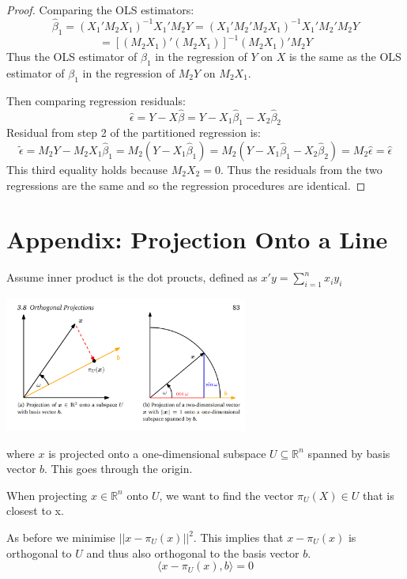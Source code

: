 \documentclass[DIV=14,titlepage=false]{scrreprt}
\begin{document}
\begin{proof}
Comparing the OLS estimators:
\[\hat{\beta}_1=(X_1'M_2X_1)^{-1}X_1'M_2Y=(X_1'M_2'M_2X_1)^{-1}X_1'M_2'M_2Y\]
\[=[(M_2X_1)'(M_2X_1)]^{-1}(M_2X_1)'M_2Y\]
Thus the OLS estimator of \(\beta_1\) in the regression of \(Y\) on \(X\) is the same as the OLS estimator of \(\beta_1\) in the regression of \(M_2Y\) on \(M_2X_1\).

Then comparing regression residuals:
\[\hat{\epsilon}=Y-X\hat{\beta}=Y-X_1\hat\beta_1-X_2\hat\beta_2\]
Residual from step 2 of the partitioned regression is:
\[\tilde{\epsilon}=M_2Y-M_2X_1\hat{\beta}_1 = M_2(Y-X_1\hat{\beta}_1)=M_2(Y-X_1\hat{\beta}_1-X_2\hat{\beta}_2)=M_2\hat{\epsilon}=\hat{\epsilon}\]
This third equality holds because \(M_2X_2=0\). Thus the residuals from the two regressions are the same and so the regression procedures are identical.

\end{proof}

\section{Appendix: Projection Onto a Line}

Assume inner product is the dot proucts, defined as \(x'y=\sum_{i=1}^{n}x_iy_i\)

\begin{center} 
\includegraphics[width=0.6\textwidth]{Projection onto a line.png}
\end{center}

where \(x\) is projected onto a one-dimensional subspace \(U\subseteq\mathbb{R}^n\) spanned by basis vector \(b\). This goes through the origin.

When projecting \(x \in \mathbb{R}^n\) onto \(U\), we want to find the vector \(\pi_U(X) \in U \) that is closest to x.

\begin{prop}
  
  As before we minimise \(||x-\pi_U(x)||^2\). This implies that \(x-\pi_U(x)\) is orthogonal to \(U\) and thus also orthogonal to the basis vector \(b\).
  \[\langle x-\pi_U(x),b \rangle = 0\]
\end{prop}
\end{document}
